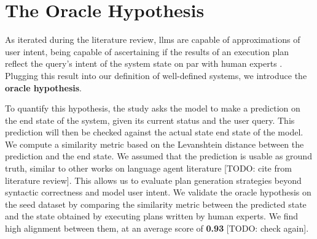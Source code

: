 \section{The Oracle Hypothesis}

As iterated during the literature review, \glspl{llm} are capable of approximations of user intent, being capable of ascertaining if the results of an execution plan reflect the query's intent of the system state on par with human experts \cite{zheng2023judgingllmasajudgemtbenchchatbot} \cite{qin2023toolllmfacilitatinglargelanguage}. Plugging this result into our definition of well-defined systems, we introduce the \textbf{oracle hypothesis}.

\pskip

{
\centering
{}
}

\pskip

To quantify this hypothesis, the study asks the model to make a prediction on the end state of the system, given its current status and the user query. This prediction will then be checked against the actual state end state of the model. We compute a similarity metric based on the Levanshtein distance between the prediction and the end state. We assumed that the prediction is usable as ground truth, similar to other works on language agent literature [TODO: cite from literature review]. This allows us to evaluate plan generation strategies beyond syntactic correctness and model user intent. We validate the oracle hypothesis on the seed dataset by comparing the similarity metric between the predicted state and the state obtained by executing plans written by human experts. We find high alignment between them, at an average score of \textbf{0.93} [TODO: check again].
